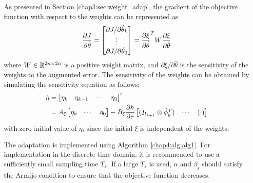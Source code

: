 As presented in Section \ref{chap3:sec:weight_adap}, the gradient of the objective function with respect to the weights can be represented as
\begin{equation}
    {\partial J\over\partial \hat\theta}
    =
    \begin{bmatrix}
        \partial J/\partial\hat\theta_k\\\vdots\\\partial J/\partial\hat\theta_0\\
    \end{bmatrix}
    =
    {\partial \xi\over\partial \hat\theta}^TW
    {\partial \xi\over\partial \hat\theta}
\end{equation}
where $W\in\mathbb{R}^{2n\times 2n}$ is a positive weight matrix, and $\partial \xi/\partial \hat\theta$ is the sensitivity of the weights to the augmented error.
The sensitivity of the weights can be obtained by simulating the sensitivity equation as follows:
\begin{equation}
    \begin{aligned}
        \dot \eta&= 
        \begin{bmatrix}
            \eta_k&
            \eta_{k-1}&
            \cdots &
            \eta_0
        \end{bmatrix}'
        \\
        &=A_\xi
        \begin{bmatrix}
            \eta_k&
            \cdots &
            \eta_0
        \end{bmatrix}
        -B_\xi{\partial h\over\partial \tau}
        \begin{bmatrix}
            (I_{l_{k+1}}\otimes \hat\phi_{k}^T  )&
        \cdots&
        (\cdot)
        \end{bmatrix}
    \end{aligned}
    \label{chap4:eq:eta_dyna}
\end{equation}
with zero initial value of $\eta$, since the initial $\xi$ is independent of the weights.

The adaptation is implemented using Algorithm \ref{chap4:alg:alg1}. 
For implementation in the discrete-time domain, it is recommended to use a sufficiently small sampling time $T_s$. 
If a large $T_s$ is used, $\alpha$ and $\beta_j$ should satisfy the Armijo condition \cite[Chap.~3 eq.~(3.4)]{RN9} to ensure that the objective function decreases.

